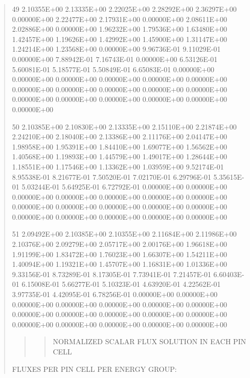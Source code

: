 \documentclass[letterpaper,10pt,english]{sphinxmanual}
\begin{document}
\begin{quote}
\begin{DUlineblock}{0em}
\item[] 49   2.10355E+00  2.13335E+00  2.22025E+00  2.28292E+00  2.36297E+00  0.00000E+00  2.22477E+00  2.17931E+00  0.00000E+00  2.08611E+00  2.02886E+00  0.00000E+00  1.96232E+00  1.79536E+00  1.63480E+00  1.42457E+00  1.19626E+00  1.42992E+00  1.45900E+00  1.31147E+00  1.24214E+00  1.23568E+00  0.00000E+00  9.96736E-01  9.11029E-01  0.00000E+00  7.88942E-01  7.16743E-01  0.00000E+00  6.53126E-01  5.60081E-01  5.18577E-01  5.50849E-01  6.65083E-01  0.00000E+00  0.00000E+00  0.00000E+00  0.00000E+00  0.00000E+00  0.00000E+00  0.00000E+00  0.00000E+00  0.00000E+00  0.00000E+00  0.00000E+00  0.00000E+00  0.00000E+00  0.00000E+00  0.00000E+00  0.00000E+00  0.00000E+00
\item[] 50   2.10385E+00  2.10830E+00  2.13335E+00  2.15110E+00  2.21874E+00  2.24210E+00  2.18040E+00  2.13386E+00  2.11176E+00  2.04147E+00  1.98958E+00  1.95391E+00  1.84410E+00  1.69077E+00  1.56562E+00  1.40568E+00  1.19893E+00  1.44579E+00  1.49017E+00  1.28644E+00  1.18551E+00  1.17546E+00  1.13362E+00  1.03959E+00  9.52174E-01  8.95538E-01  8.21677E-01  7.50520E-01  7.02170E-01  6.29796E-01  5.35615E-01  5.03244E-01  5.64925E-01  6.72792E-01  0.00000E+00  0.00000E+00  0.00000E+00  0.00000E+00  0.00000E+00  0.00000E+00  0.00000E+00  0.00000E+00  0.00000E+00  0.00000E+00  0.00000E+00  0.00000E+00  0.00000E+00  0.00000E+00  0.00000E+00  0.00000E+00  0.00000E+00
\item[] 51   2.09492E+00  2.10385E+00  2.10355E+00  2.11684E+00  2.11986E+00  2.10376E+00  2.09279E+00  2.05717E+00  2.00176E+00  1.96618E+00  1.91199E+00  1.83472E+00  1.76023E+00  1.66307E+00  1.54211E+00  1.40094E+00  1.19321E+00  1.45707E+00  1.16831E+00  1.01336E+00  9.33156E-01  8.73289E-01  8.17305E-01  7.73941E-01  7.21457E-01  6.60403E-01  6.15008E-01  5.66277E-01  5.10323E-01  4.63920E-01  4.22562E-01  3.97735E-01  4.42095E-01  6.78256E-01  0.00000E+00  0.00000E+00  0.00000E+00  0.00000E+00  0.00000E+00  0.00000E+00  0.00000E+00  0.00000E+00  0.00000E+00  0.00000E+00  0.00000E+00  0.00000E+00  0.00000E+00  0.00000E+00  0.00000E+00  0.00000E+00  0.00000E+00
\end{DUlineblock}
\begin{quote}
\begin{quote}

NORMALIZED SCALAR FLUX SOLUTION IN EACH PIN CELL
\end{quote}
\end{quote}

FLUXES  PER  PIN CELL  PER  ENERGY  GROUP:
\begin{quote}


\end{quote}
\end{quote}
\end{document}
